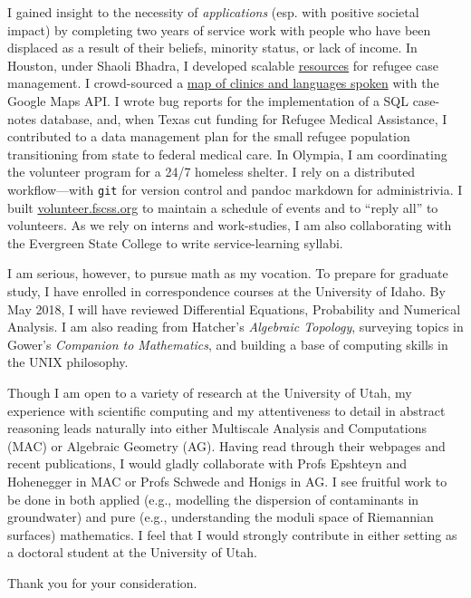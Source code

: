 \documentclass{article}
\begin{document}
I gained insight to the necessity of \emph{applications} (esp. with
positive societal impact) by completing two years of service work with people who
have been displaced as a result of their beliefs, minority status, or lack of income.
In Houston, under Shaoli Bhadra, I developed scalable
\href{https://github.com/coltongrainger/ymca-resources}{resources} for
refugee case management. I crowd-sourced a
\href{https://drive.google.com/open?id=1kk9yn6-4nifHLIf2tGYbW_7PiYo\&usp=sharing}{map
of clinics and languages spoken} with the Google Maps API. I wrote bug
reports for the implementation of a SQL case-notes database, and, when
Texas cut funding for Refugee Medical Assistance, I contributed to a
data management plan for the small refugee population transitioning from 
state to federal medical care. In Olympia, I am coordinating the volunteer program for a
24/7 homeless shelter. I rely on a distributed workflow---with \texttt{git} for version control and
pandoc markdown for administrivia. I built
\href{http://volunteer.fscss.org}{volunteer.fscss.org} to maintain a
schedule of events and to ``reply all'' to volunteers. As we rely on
interns and work-studies, I am also collaborating with the 
Evergreen State College to write service-learning syllabi. 

I am serious, however, to pursue math as my vocation. To prepare for graduate 
study, I have enrolled in correspondence courses at the University of Idaho.
By May 2018, I will have reviewed Differential Equations,  
Probability and Numerical Analysis. I am also reading from 
Hatcher's \emph{Algebraic Topology}, surveying topics in Gower's \emph{Companion to Mathematics},
and building a base of computing skills in the UNIX philosophy. 

Though I am open to a variety of research at the University of Utah,
my experience with scientific computing and my attentiveness to detail in abstract reasoning 
leads naturally into either Multiscale Analysis and Computations (MAC) or Algebraic
Geometry (AG). Having read through their webpages and recent publications,
I would gladly collaborate with Profs Epshteyn and Hohenegger 
in MAC or Profs Schwede and Honigs in AG. I see fruitful work to be done in both
applied (e.g., modelling the dispersion of contaminants in groundwater) and 
pure (e.g., understanding the moduli space of Riemannian surfaces) mathematics.
I feel that I would strongly contribute in either setting as a doctoral 
student at the University of Utah. 

Thank you for your consideration. 
\end{document}
